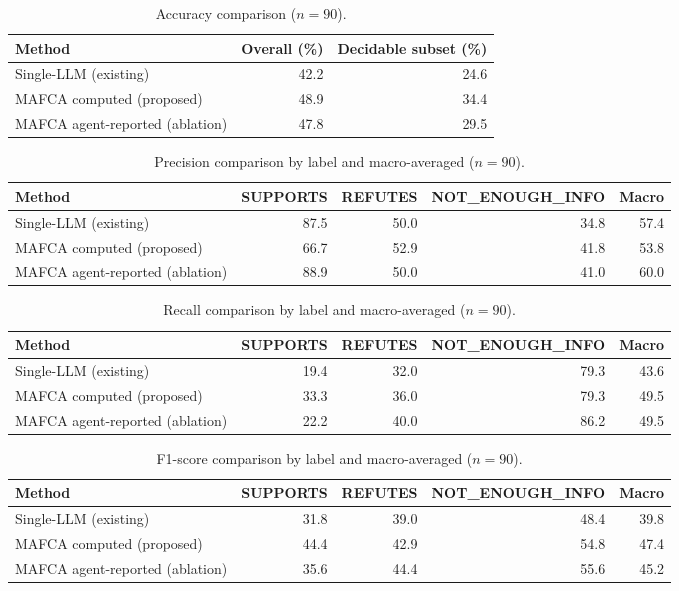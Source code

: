 
\begin{table}[H]
\centering
\caption{Accuracy comparison ($n = 90$).}
\label{tab:acc}
\small
\begin{tabular}{@{}lrr@{}}
\toprule
Method & Overall (\%) & Decidable subset (\%) \\
\midrule
Single-LLM (existing) & 42.2 & 24.6 \\
MAFCA computed (proposed) & 48.9 & 34.4 \\
MAFCA agent-reported (ablation) & 47.8 & 29.5 \\
\bottomrule
\end{tabular}
\end{table}

\begin{table}[H]
\centering
\caption{Precision comparison by label and macro-averaged ($n = 90$).}
\label{tab:precision}
\small
\begin{tabular}{@{}lrrrr@{}}
\toprule
Method & SUPPORTS & REFUTES & NOT\_ENOUGH\_INFO & Macro \\
\midrule
Single-LLM (existing) & 87.5 & 50.0 & 34.8 & 57.4 \\
MAFCA computed (proposed) & 66.7 & 52.9 & 41.8 & 53.8 \\
MAFCA agent-reported (ablation) & 88.9 & 50.0 & 41.0 & 60.0 \\
\bottomrule
\end{tabular}
\end{table}

\begin{table}[H]
\centering
\caption{Recall comparison by label and macro-averaged ($n = 90$).}
\label{tab:recall}
\small
\begin{tabular}{@{}lrrrr@{}}
\toprule
Method & SUPPORTS & REFUTES & NOT\_ENOUGH\_INFO & Macro \\
\midrule
Single-LLM (existing) & 19.4 & 32.0 & 79.3 & 43.6 \\
MAFCA computed (proposed) & 33.3 & 36.0 & 79.3 & 49.5 \\
MAFCA agent-reported (ablation) & 22.2 & 40.0 & 86.2 & 49.5 \\
\bottomrule
\end{tabular}
\end{table}

\begin{table}[H]
\centering
\caption{F1-score comparison by label and macro-averaged ($n = 90$).}
\label{tab:f1}
\small
\begin{tabular}{@{}lrrrr@{}}
\toprule
Method & SUPPORTS & REFUTES & NOT\_ENOUGH\_INFO & Macro \\
\midrule
Single-LLM (existing) & 31.8 & 39.0 & 48.4 & 39.8 \\
MAFCA computed (proposed) & 44.4 & 42.9 & 54.8 & 47.4 \\
MAFCA agent-reported (ablation) & 35.6 & 44.4 & 55.6 & 45.2 \\
\bottomrule
\end{tabular}
\end{table}

